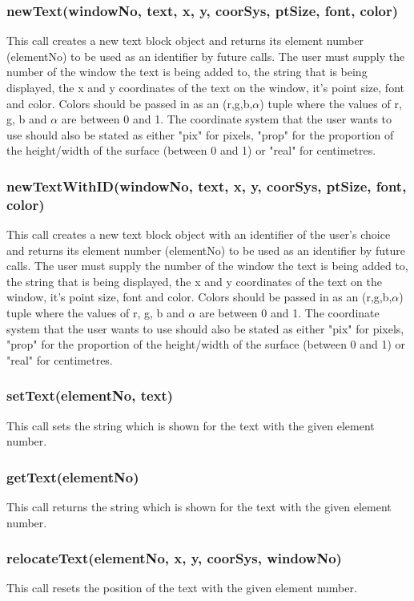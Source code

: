 \documentclass{acm_proc_article-sp}
\begin{document}
\subsubsection{newText(windowNo, text, x, y, coorSys, ptSize, font, color)}
This call creates a new text block object and returns its element number (elementNo) to be used as an identifier by future calls. The user must supply the number of the window the text is being added to, the string that is being displayed, the x and y coordinates of the text on the window, it's point size, font and color. Colors should be passed in as an (r,g,b,$\alpha$) tuple where the values of r, g, b and $\alpha$ are between 0 and 1. The coordinate system that the user wants to use should also be stated as either "pix" for pixels, "prop" for the proportion of the height/width of the surface (between 0 and 1) or "real" for centimetres.
\subsubsection{newTextWithID(windowNo, text, x, y, coorSys, ptSize, font, color)}
This call creates a new text block object with an identifier of the user's choice and returns its element number (elementNo) to be used as an identifier by future calls. The user must supply the number of the window the text is being added to, the string that is being displayed, the x and y coordinates of the text on the window, it's point size, font and color. Colors should be passed in as an (r,g,b,$\alpha$) tuple where the values of r, g, b and $\alpha$ are between 0 and 1. The coordinate system that the user wants to use should also be stated as either "pix" for pixels, "prop" for the proportion of the height/width of the surface (between 0 and 1) or "real" for centimetres.
\subsubsection{setText(elementNo, text)}
This call sets the string which is shown for the text with the given element number.
\subsubsection{getText(elementNo)}
This call returns the string which is shown for the text with the given element number.
\subsubsection{relocateText(elementNo, x, y, coorSys, windowNo)}
This call resets the position of the text with the given element number.
\end{document}
